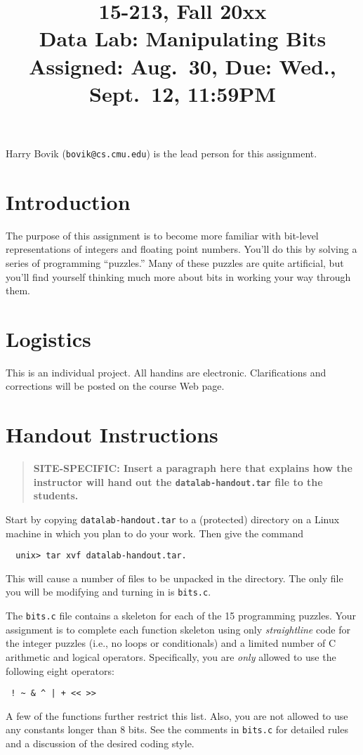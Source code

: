 \documentclass[11pt]{article}
\begin{document}
\title{15-213, Fall 20xx\\
Data Lab: Manipulating Bits\\
Assigned: Aug.~30, Due: Wed., Sept.~12, 11:59PM
}

\author{}
\date{}

\maketitle

Harry Bovik ({\tt bovik@cs.cmu.edu}) is the lead person for
this assignment.

\section{Introduction}
The purpose of this assignment is to become more familiar with
bit-level representations of integers and floating point numbers.
You'll do this by solving a series of programming ``puzzles.'' Many of
these puzzles are quite artificial, but you'll find yourself thinking
much more about bits in working your way through them.

\section{Logistics}

This is an individual project. All handins are electronic.
Clarifications and corrections will be posted on the course Web page.

\section{Handout Instructions}

\begin{quote}
\bf SITE-SPECIFIC: Insert a paragraph here that explains how the
instructor will hand out the {\tt datalab-handout.tar} file to the
students.
\end{quote}

Start by copying {\tt datalab-handout.tar} to a (protected) directory
on a Linux machine in which you plan to do your work.  Then give the
command
\begin{verbatim}
  unix> tar xvf datalab-handout.tar.  
\end{verbatim}
This will cause a number of files to be unpacked in the directory.
The only file you will be modifying and turning in is {\tt bits.c}.

The {\tt bits.c} file contains a skeleton for each of the 15
programming puzzles.  Your assignment is to complete each function
skeleton using only {\em straightline} code for the integer puzzles
(i.e., no loops or conditionals) and a limited number of C arithmetic
and logical operators. Specifically, you are {\em only} allowed to use
the following eight operators:
\begin{verbatim}
 ! ~ & ^ | + << >>
\end{verbatim}
A few of the functions further restrict this list.  Also, you are not
allowed to use any constants longer than 8 bits.  See the comments in
{\tt bits.c} for detailed rules and a discussion of the desired coding
style.
\end{document}
